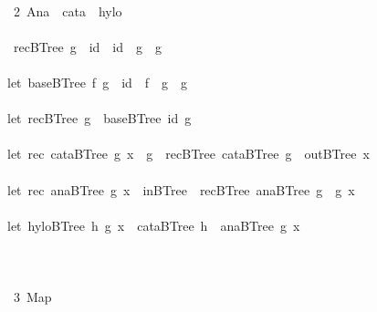 \documentclass[a4paper]{article}
\begin{document}
\begin{tabbing}
\ttfamily ~\\
\ttfamily ~~2~Ana~~cata~~hylo~\\
\ttfamily ~\\
\ttfamily ~~recBTree~g~~id~~id~~g~~g\\
\ttfamily ~\\
\ttfamily ~let~baseBTree~f~g~~id~~f~~g~~g\\
\ttfamily ~\\
\ttfamily ~let~recBTree~g~~baseBTree~id~g\\
\ttfamily ~\\
\ttfamily ~let~rec~cataBTree~g~x~~g~~recBTree~cataBTree~g~~outBTree~x\\
\ttfamily ~\\
\ttfamily ~let~rec~anaBTree~g~x~~inBTree~~recBTree~anaBTree~g~~g~x\\
\ttfamily ~\\
\ttfamily ~let~hyloBTree~h~g~x~~cataBTree~h~~anaBTree~g~x\\
\ttfamily ~\\
\ttfamily ~\\
\ttfamily ~\\
\ttfamily ~~3~Map~\\

\end{tabbing}
\end{document}
